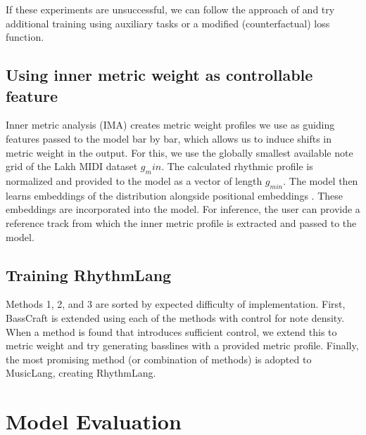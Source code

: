 If these experiments are unsuccessful, we can follow the approach of \cite{Shu_Xu_Musebarcontrol_2024} and try additional training using auxiliary tasks or a modified (counterfactual) loss function. 

\subsection{Using inner metric weight as controllable feature}
Inner metric analysis (IMA) creates metric weight profiles we use as guiding features passed to the model bar by bar, which allows us to induce shifts in metric weight in the output. 
For this, we use the globally smallest available note grid of the Lakh MIDI dataset $g_min$. The calculated rhythmic profile is normalized and provided to the model as a vector of length $g_{min}$.
The model then learns embeddings of the distribution alongside positional embeddings \cite{Lin_cocomulla_2024}. These embeddings are incorporated into the model. For inference, the user can provide a reference track from which the inner metric profile is extracted and passed to the model. 

\subsection{Training RhythmLang}
Methods 1, 2, and 3 are sorted by expected difficulty of implementation. First, BassCraft is extended using each of the methods with control for note density. When a method is found that introduces sufficient control, we extend this to metric weight and try generating basslines with a provided metric profile. Finally, the most promising method (or combination of methods) is adopted to MusicLang, creating RhythmLang.

\section{Model Evaluation}
